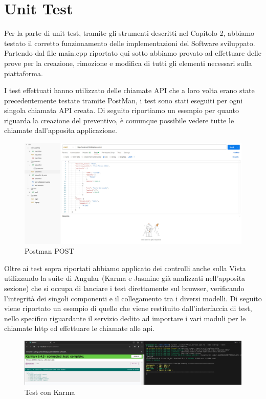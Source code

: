 \documentclass[a4paper, 11pt,oneside]{book}
\newcommand{\spacing}{\par\bigskip\noindent}
\begin{document}
    \section{Unit Test}
        Per la parte di unit test, tramite gli strumenti descritti nel Capitolo 2, abbiamo testato il corretto funzionamento delle implementazioni del Software sviluppato. Partendo dal file main.cpp riportato qui sotto abbiamo provato ad effettuare delle prove per la creazione, rimozione e modifica di tutti gli elementi
        necessari sulla piattaforma.
        \spacing
        
        \spacing
        I test effettuati hanno utilizzato delle chiamate API che a loro volta erano state precedentemente testate tramite PostMan, i test sono stati eseguiti per ogni singola chiamata API creata. Di seguito riportiamo un esempio per quanto riguarda la creazione del preventivo, è comunque possibile vedere
        tutte le chiamate dall'apposita applicazione.
        \begin{figure}[H]
            \includegraphics[width=\textwidth]{Postman_POST.jpeg}
            \caption{Postman POST}
            \label{fig:postman_post}
        \end{figure}
        \spacing
        Oltre ai test sopra riportati abbiamo applicato dei controlli anche sulla Vista utilizzando la suite di Angular (Karma e Jasmine già analizzati nell'apposita sezione) che si occupa di lanciare i test direttamente sul browser, verificando l'integrità dei singoli componenti e il collegamento tra
        i diversi modelli. Di seguito viene riportato un esempio di quello che viene restituito dall'interfaccia di test, nello specifico riguardante il servizio dedito ad importare i vari moduli per le chiamate http ed effettuare le chiamate alle api.
        \begin{figure}[H]
            \includegraphics[width=\textwidth]{Karma_Test.jpeg}
            \caption{Test con Karma}
            \label{fig:Karma_test}
        \end{figure}
        \spacing
\end{document}
